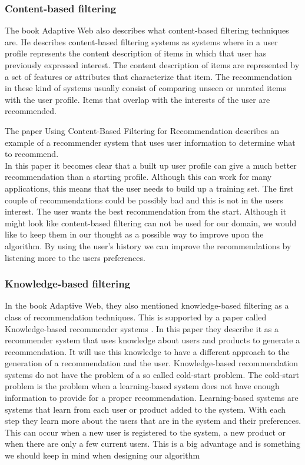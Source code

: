 \documentclass[]{article}
\begin{document}
\subsubsection{Content-based filtering}
The book Adaptive Web \citep{Peter2007} also describes what content-based filtering techniques are.
He describes content-based filtering systems as systems where in a user profile represents the content description of items in which that user has previously expressed interest.
The content description of items are represented by a set of features or attributes that characterize that item.
The recommendation in these kind of systems usually consist of comparing unseen or unrated items with the user profile.
Items that overlap with the interests of the user are recommended.

The paper Using Content-Based Filtering for Recommendation \cite{van2000using} describes an example of a recommender system that uses user information to determine what to recommend.\\
In this paper it becomes clear that a built up user profile can give a much better recommendation than a starting profile.
Although this can work for many applications, this means that the user needs to build up a training set.
The first couple of recommendations could be possibly bad and this is not in the users interest.
The user wants the best recommendation from the start.
Although it might look like content-based filtering can not be used for our domain, we would like to keep them in our thought as a possible way to improve upon the algorithm.
By using the user's history we can improve the recommendations by listening more to the users preferences.

\subsubsection{Knowledge-based filtering}
In the book Adaptive Web, they also mentioned knowledge-based filtering as a class of recommendation techniques.
This is supported by a paper called Knowledge-based recommender systems \cite{burke2000knowledge}.
In this paper they describe it as a recommender system that uses knowledge about users and products to generate a recommendation.
It will use this knowledge to have a different approach to the generation of a recommendation and the user.
Knowledge-based recommendation systems do not have the problem of a so called cold-start problem.
The cold-start problem is the problem when a learning-based system does not have enough information to provide for a proper recommendation.
Learning-based systems are systems that learn from each user or product added to the system.
With each step they learn more about the users that are in the system and their preferences.
This can occur when a new user is registered to the system, a new product or when there are only a few current users.
This is a big advantage and is something we should keep in mind when designing our algorithm
\end{document}
